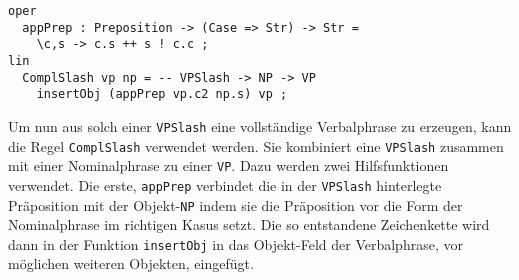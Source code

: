 \begin{lstlisting}[float=h!tp,caption={Die Syntaxregel \texttt{ComplSlash} um eine \texttt{VPSlash} und eine \texttt{NP} zu einer Verbalphrase zu verbinden (vgl. \textbf{NounLat.gf} und \textbf{ResLat.gf})},label={GF-Noun-ComplSlash}]
oper
  appPrep : Preposition -> (Case => Str) -> Str =
    \c,s -> c.s ++ s ! c.c ;
lin
  ComplSlash vp np = -- VPSlash -> NP -> VP
    insertObj (appPrep vp.c2 np.s) vp ;
\end{lstlisting}
Um nun aus solch einer \texttt{VPSlash} eine vollständige Verbalphrase zu erzeugen, kann die Regel \texttt{ComplSlash} verwendet werden. Sie kombiniert eine \texttt{VPSlash} zusammen mit einer Nominalphrase zu einer \texttt{VP}. Dazu werden zwei Hilfsfunktionen verwendet. Die erste, \texttt{appPrep} verbindet die in der \texttt{VPSlash} hinterlegte Präposition mit der Objekt-\texttt{NP} indem sie die Präposition vor die Form der Nominalphrase im richtigen Kasus setzt. Die so entstandene Zeichenkette wird dann in der Funktion \texttt{insertObj} in das Objekt-Feld der Verbalphrase, vor möglichen weiteren Objekten, eingefügt.
\FloatBarrier
